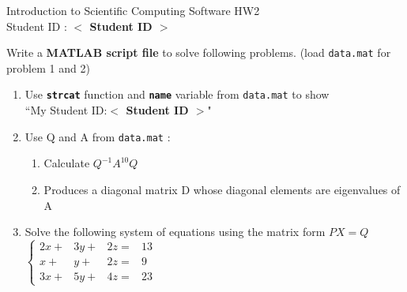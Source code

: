 \documentclass[12pt,a4paper]{article}
\newcommand{\placeholder}[1]{\textbf{$<$ #1 $>$}}
\newcommand{\idnumber}{\placeholder{Student ID}}
\begin{document}
\begin{flushleft}Introduction to Scientific Computing Software HW2
\\Student ID : \idnumber{}\end{flushleft}

Write a \textbf{MATLAB script file} to solve following problems. (load \texttt{data.mat} for problem 1 and 2)
\begin{enumerate}
\item Use \textbf{\texttt{strcat}} function and \textbf{\texttt{name}} variable from \texttt{data.mat} to show \\``My Student ID:\idnumber{}"
\item Use Q and A from \texttt{data.mat} :
\begin{enumerate}
\item Calculate $Q^{-1}A^{10}Q$
\item Produces a diagonal matrix D whose diagonal elements are eigenvalues of A
\end{enumerate}
\item Solve the following system of equations using the matrix form $PX=Q$ \\[1em] $\displaystyle{\left\{\begin{array}{rrrl}2x+&3y+&2z=&13\\x+&y+&2z=&9\\3x+&5y+&4z=&23\end{array}\right.}$
\end{enumerate}
\end{document}
